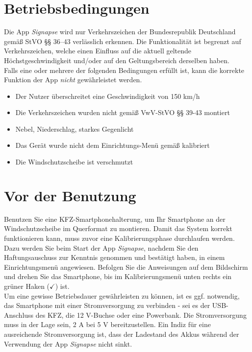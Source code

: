 \documentclass[12pt,a4paper,ngerman,enabledeprecatedfontcommands]{article}
\begin{document}
\section{Betriebsbedingungen}
Die App \textit{Signapse} wird nur Verkehrszeichen der Bundesrepublik Deutschland gemäß StVO §§ 36–43 verlässlich erkennen. Die Funktionalität ist begrenzt auf Verkehrszeichen, welche einen Einfluss auf die aktuell geltende Höchstgeschwindigkeit und/oder auf den Geltungsbereich derselben haben.\\

Falls eine oder mehrere der folgenden Bedingungen erfüllt ist, kann die korrekte Funktion der App \emph{nicht} gewährleistet werden.

\begin{itemize}
    \item Der Nutzer überschreitet eine Geschwindigkeit von 150 km/h
    \item Die Verkehrszeichen wurden nicht gemäß VwV-StVO §§ 39-43 montiert
    \item Nebel, Niederschlag, starkes Gegenlicht
    \item Das Gerät wurde nicht dem Einrichtungs-Menü gemäß kalibriert
    \item Die Windschutzscheibe ist verschmutzt
\end{itemize}

\section{Vor der Benutzung}

Benutzen Sie eine KFZ-Smartphonehalterung, um Ihr Smartphone an der Windschutzscheibe im Querformat zu montieren. Damit das System korrekt funktionieren kann, muss zuvor eine Kalibrierungsphase durchlaufen werden. Dazu werden Sie beim Start der App \textit{Signapse}, nachdem Sie den Haftungsauschuss zur Kenntnis genommen und bestätigt haben, in einem Einrichtungsmenü angewiesen. Befolgen Sie die Anweisungen auf dem Bildschirm und drehen Sie das Smartphone, bis im Kalibrierungsmenü unten rechts ein grüner Haken ($\checkmark$) ist. \\

Um eine gewisse Betriebsdauer gewährleisten zu können, ist es ggf. notwendig, das Smartphone mit einer Stromversorgung zu verbinden - sei es der USB-Anschluss des KFZ, die 12 V-Buchse oder eine Powerbank. Die Stromversorgung muss in der Lage sein, 2 A bei 5 V bereitzustellen. Ein Indiz für eine ausreichende Stromversorgung ist, dass der Ladestand des Akkus während der Verwendung der App \textit{Signapse} nicht sinkt.
\end{document}
